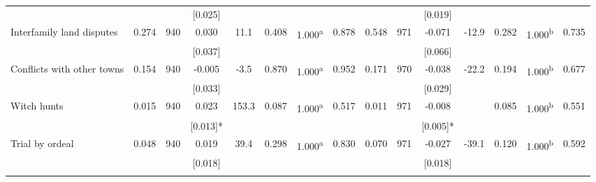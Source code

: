 \begin{tabular}{lcccccccccccccc}
 &  &  & [0.025] &  &  &  &  &  &  & [0.019] &  &  &  & \\
\quad Interfamily land disputes & 0.274 & 940 & 0.030 & 11.1 & 0.408 & 1.000\textsuperscript{a} & 0.878 & 0.548 & 971 & -0.071 & -12.9 & 0.282 & 1.000\textsuperscript{b} & 0.735\\
 &  &  & [0.037] &  &  &  &  &  &  & [0.066] &  &  &  & \\
\quad Conflicts with other towns & 0.154 & 940 & -0.005 & -3.5 & 0.870 & 1.000\textsuperscript{a} & 0.952 & 0.171 & 970 & -0.038 & -22.2 & 0.194 & 1.000\textsuperscript{b} & 0.677\\
 &  &  & [0.033] &  &  &  &  &  &  & [0.029] &  &  &  & \\
\quad Witch hunts & 0.015 & 940 & 0.023 & 153.3 & 0.087 & 1.000\textsuperscript{a} & 0.517 & 0.011 & 971 & -0.008 &  & 0.085 & 1.000\textsuperscript{b} & 0.551\\
 &  &  & [0.013]* &  &  &  &  &  &  & [0.005]* &  &  &  & \\
\quad Trial by ordeal & 0.048 & 940 & 0.019 & 39.4 & 0.298 & 1.000\textsuperscript{a} & 0.830 & 0.070 & 971 & -0.027 & -39.1 & 0.120 & 1.000\textsuperscript{b} & 0.592\\
 &  &  & [0.018] &  &  &  &  &  &  & [0.018] &  &  &  & \\
\noalign{\smallskip}\hline\end{tabular}
